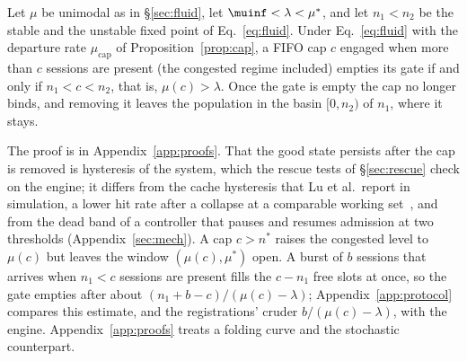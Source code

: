 \begin{corollary}\label{cor:rescue}
Let $\mu$ be unimodal as in \S\ref{sec:fluid}, let $\muinf<\lambda<\mu^*$, and let $n_1<n_2$ be the stable and the unstable fixed point of Eq.~\eqref{eq:fluid}. Under Eq.~\eqref{eq:fluid} with the departure rate $\mu_{\mathrm{cap}}$ of Proposition~\ref{prop:cap}, a FIFO cap $c$ engaged when more than $c$ sessions are present (the congested regime included) empties its gate if and only if $n_1<c<n_2$, that is, $\mu(c)>\lambda$. Once the gate is empty the cap no longer binds, and removing it leaves the population in the basin $[0,n_2)$ of $n_1$, where it stays.
\end{corollary}
The proof is in Appendix~\ref{app:proofs}. That the good state persists after the cap is removed is hysteresis of the system, which the rescue tests of \S\ref{sec:rescue} check on the engine; it differs from the cache hysteresis that Lu et al.\ report in simulation, a lower hit rate after a collapse at a comparable working set~\citep{lu2026cachetrap}, and from the dead band of a controller that pauses and resumes admission at two thresholds (Appendix~\ref{sec:mech}). A cap $c>n^*$ raises the congested level to $\mu(c)$ but leaves the window $(\mu(c),\mu^*)$ open. A burst of $b$ sessions that arrives when $n_1<c$ sessions are present fills the $c-n_1$ free slots at once, so the gate empties after about $(n_1+b-c)/(\mu(c)-\lambda)$; Appendix~\ref{app:protocol} compares this estimate, and the registrations' cruder $b/(\mu(c)-\lambda)$, with the engine. Appendix~\ref{app:proofs} treats a folding curve and the stochastic counterpart.
